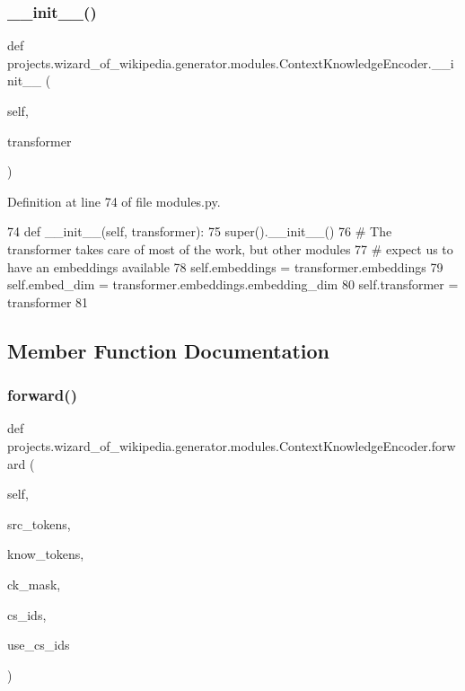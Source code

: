 \subsubsection{\texorpdfstring{\+\_\+\+\_\+init\+\_\+\+\_\+()}{\_\_init\_\_()}}
{\footnotesize\ttfamily def projects.\+wizard\+\_\+of\+\_\+wikipedia.\+generator.\+modules.\+Context\+Knowledge\+Encoder.\+\_\+\+\_\+init\+\_\+\+\_\+ (\begin{DoxyParamCaption}\item[{}]{self,  }\item[{}]{transformer }\end{DoxyParamCaption})}



Definition at line 74 of file modules.\+py.


\begin{DoxyCode}
74     \textcolor{keyword}{def }\_\_init\_\_(self, transformer):
75         super().\_\_init\_\_()
76         \textcolor{comment}{# The transformer takes care of most of the work, but other modules}
77         \textcolor{comment}{# expect us to have an embeddings available}
78         self.embeddings = transformer.embeddings
79         self.embed\_dim = transformer.embeddings.embedding\_dim
80         self.transformer = transformer
81 
\end{DoxyCode}


\subsection{Member Function Documentation}
\mbox{\label{classprojects_1_1wizard__of__wikipedia_1_1generator_1_1modules_1_1ContextKnowledgeEncoder_a482a0f0798408978ba2902159517d84b}} 
\subsubsection{\texorpdfstring{forward()}{forward()}}
{\footnotesize\ttfamily def projects.\+wizard\+\_\+of\+\_\+wikipedia.\+generator.\+modules.\+Context\+Knowledge\+Encoder.\+forward (\begin{DoxyParamCaption}\item[{}]{self,  }\item[{}]{src\+\_\+tokens,  }\item[{}]{know\+\_\+tokens,  }\item[{}]{ck\+\_\+mask,  }\item[{}]{cs\+\_\+ids,  }\item[{}]{use\+\_\+cs\+\_\+ids }\end{DoxyParamCaption})}



